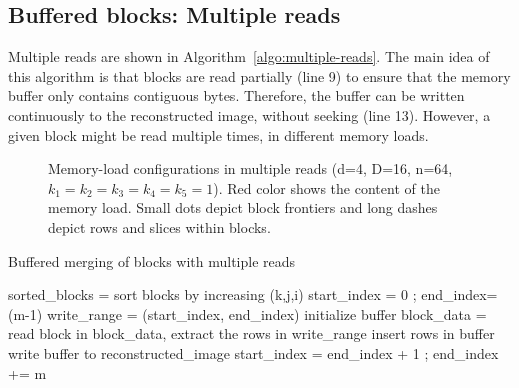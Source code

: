 \documentclass[10pt, conference, compsocconf]{IEEEtran}
\begin{document}

   
\subsection{Buffered blocks: Multiple reads}

Multiple reads are shown in Algorithm~\ref{algo:multiple-reads}.  The
main idea of this algorithm is that blocks are read partially (line 9)
to ensure that the memory buffer only contains contiguous
bytes. Therefore, the buffer can be written continuously to the
reconstructed image, without seeking (line 13).  However, a given
block might be read multiple times, in different memory loads.

\begin{figure}
\centering
\def\svgwidth{0.3\columnwidth}

\def\svgwidth{0.3\columnwidth}

\def\svgwidth{0.3\columnwidth}


\medskip

\def\svgwidth{0.3\columnwidth}

\def\svgwidth{0.3\columnwidth}

\caption{Memory-load configurations in multiple reads (d=4, D=16,
  n=64, $k_1=k_2=k_3=k_4=k_5=1$). Red color shows the content of the
  memory load. Small dots depict block frontiers and long dashes
  depict rows and slices within blocks.}
\label{fig:multiple-reads-cases}
\end{figure}



\begin{algorithm}[h]
  \caption{Buffered merging of blocks with multiple reads}
  \label{algo:multiple-reads}
  \begin{algorithmic}[1]
  \STATE sorted\_blocks = sort blocks by increasing (k,j,i)
  \STATE start\_index = 0 ; end\_index=(m-1)
  \STATE write\_range = (start\_index, end\_index)
    \STATE initialize buffer
        \STATE block\_data = read block
        \STATE in block\_data, extract the rows in write\_range
        \STATE insert rows in buffer
      \ENDIF
    \ENDFOR
    \STATE write buffer to reconstructed\_image
    \STATE start\_index = end\_index + 1 ; end\_index += m
  \ENDWHILE

  \end{algorithmic}
\end{algorithm}
\end{document}
